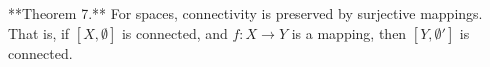 **Theorem 7.** For spaces, connectivity is preserved by surjective mappings. That is, if $[X, \emptyset]$ is connected, and $f: X \rightarrow Y$ is a mapping, then $[Y, \emptyset']$ is connected.
